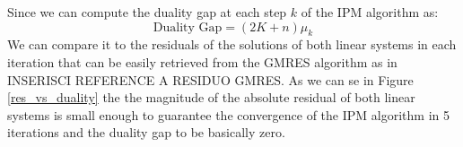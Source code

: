 \noindent Since we can compute the duality gap at each step \(k\) of the IPM algorithm as:
\[
	\text{Duality Gap} = (2K + n)\mu_k\]
We can compare it to the residuals of the solutions of both linear systems in each iteration that can be easily retrieved from the GMRES algorithm as in INSERISCI REFERENCE A RESIDUO GMRES. As we can se in Figure \ref{res_vs_duality} the the magnitude of the absolute residual of both linear systems is small enough to  guarantee the convergence of the IPM algorithm in 5 iterations and the duality gap to be basically zero. 